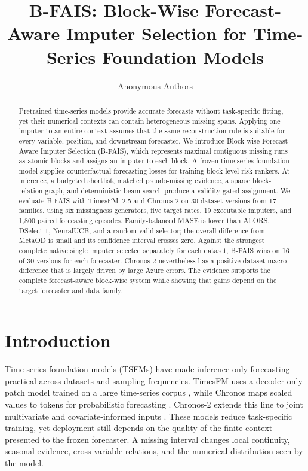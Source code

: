 \documentclass{article}
\title{B-FAIS: Block-Wise Forecast-Aware Imputer Selection for Time-Series Foundation Models}
\author{Anonymous Authors}
\newcommand{\bfais}{\textsc{B-FAIS}\xspace}
\begin{document}
\maketitle

\begin{abstract}
Pretrained time-series models provide accurate forecasts without task-specific fitting, yet their numerical contexts can contain heterogeneous missing spans. Applying one imputer to an entire context assumes that the same reconstruction rule is suitable for every variable, position, and downstream forecaster. We introduce Block-wise Forecast-Aware Imputer Selection (\bfais), which represents maximal contiguous missing runs as atomic blocks and assigns an imputer to each block. A frozen time-series foundation model supplies counterfactual forecasting losses for training block-level risk rankers. At inference, a budgeted shortlist, matched pseudo-missing evidence, a sparse block-relation graph, and deterministic beam search produce a validity-gated assignment. We evaluate \bfais with TimesFM~2.5 and Chronos-2 on 30 dataset versions from 17 families, using six missingness generators, five target rates, 19 executable imputers, and 1,800 paired forecasting episodes. Family-balanced MASE is lower than ALORS, DSelect-1, NeuralUCB, and a random-valid selector; the overall difference from MetaOD is small and its confidence interval crosses zero. Against the strongest complete native single imputer selected separately for each dataset, \bfais wins on 16 of 30 versions for each forecaster. Chronos-2 nevertheless has a positive dataset-macro difference that is largely driven by large Azure errors. The evidence supports the complete forecast-aware block-wise system while showing that gains depend on the target forecaster and data family.
\end{abstract}

\section{Introduction}
\label{sec:introduction}

Time-series foundation models (TSFMs) have made inference-only forecasting practical across datasets and sampling frequencies. TimesFM uses a decoder-only patch model trained on a large time-series corpus \citep{das2024timesfm}, while Chronos maps scaled values to tokens for probabilistic forecasting \citep{ansari2024chronos}. Chronos-2 extends this line to joint multivariate and covariate-informed inputs \citep{ansari2025chronos2}. These models reduce task-specific training, yet deployment still depends on the quality of the finite context presented to the frozen forecaster. A missing interval changes local continuity, seasonal evidence, cross-variable relations, and the numerical distribution seen by the model.
\end{document}
